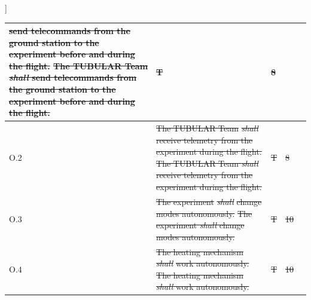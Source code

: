 ]\documentclass[a4paper,12pt,twoside]{article}
\providecommand{\DIFaddtex}[1]{{\protect\color{blue}\uwave{#1}}} %
\providecommand{\DIFdeltex}[1]{{\protect\color{red}\sout{#1}}}                      %
\providecommand{\DIFaddbegin}{} %
\providecommand{\DIFaddend}{} %
\providecommand{\DIFdelbegin}{} %
\providecommand{\DIFdelend}{} %
\providecommand{\DIFadd}[1]{\texorpdfstring{\DIFaddtex{#1}}{#1}} %
\providecommand{\DIFdel}[1]{\texorpdfstring{\DIFdeltex{#1}}{}} %
\newcommand{\DIFscaledelfig}{0.5}
\newlength{\DIFdelgraphicswidth} %
\newlength{\DIFdelgraphicsheight} %
\newcommand{\DIFaddincludegraphics}[2][]{{\color{blue}\fbox{\DIFOincludegraphics[#1]{#2}}}} %
\newcommand{\DIFdelincludegraphics}[2][]{%
\sbox{\DIFdelgraphicsbox}{\DIFOincludegraphics[#1]{#2}}%
\settoboxwidth{\DIFdelgraphicswidth}{\DIFdelgraphicsbox} %
\settoboxtotalheight{\DIFdelgraphicsheight}{\DIFdelgraphicsbox} %
\scalebox{\DIFscaledelfig}{%
\parbox[b]{\DIFdelgraphicswidth}{\usebox{\DIFdelgraphicsbox}\\[-\baselineskip] \rule{\DIFdelgraphicswidth}{0em}}\llap{\resizebox{\DIFdelgraphicswidth}{\DIFdelgraphicsheight}{%
\setlength{\unitlength}{\DIFdelgraphicswidth}%
\begin{picture}(1,1)%
\thicklines\linethickness{2pt} %
{\color[rgb]{1,0,0}\put(0,0){\framebox(1,1){}}}%
{\color[rgb]{1,0,0}\put(0,0){\line( 1,1){1}}}%
{\color[rgb]{1,0,0}\put(0,1){\line(1,-1){1}}}%
\end{picture}%
}\hspace*{3pt}}} %
} %
\DeclareRobustCommand{\DIFaddbegin}{\DIFOaddbegin \let\includegraphics\DIFaddincludegraphics} %
\DeclareRobustCommand{\DIFaddend}{\DIFOaddend \let\includegraphics\DIFOincludegraphics} %
\DeclareRobustCommand{\DIFdelbegin}{\DIFOdelbegin \let\includegraphics\DIFdelincludegraphics} %
\DeclareRobustCommand{\DIFdelend}{\DIFOaddend \let\includegraphics\DIFOincludegraphics} %
\begin{document}
\begin{longtable}[]{|m{}| m{} |m{} |m{}|m{}|}
\DIFdel{send telecommands from the ground station to the experiment before and during the flight.                                             }\DIFdelend \DIFaddbegin \st{The TUBULAR Team \textit{shall} send telecommands from the ground station to the experiment before and during the flight.}\DIFadd{\textsuperscript{\ref{fn:unnecessary-requirement}}                                             }\DIFaddend &    \DIFdelbegin \DIFdel{T          }\DIFdelend \DIFaddbegin \DIFadd{-  }\DIFaddend & \DIFdelbegin \DIFdel{8            }\DIFdelend \DIFaddbegin \DIFadd{-            }\DIFaddend &        \\ \hline
O.2  & \DIFdelbegin \DIFdel{The TUBULAR Team }\textit{\DIFdel{shall}} %
\DIFdel{receive telemetry from the experiment during the flight.                                                                              }\DIFdelend \DIFaddbegin \st{The TUBULAR Team \textit{shall} receive telemetry from the experiment during the flight.}\DIFadd{\textsuperscript{\ref{fn:unnecessary-requirement}}                                                                              }\DIFaddend &   \DIFdelbegin \DIFdel{T          }\DIFdelend \DIFaddbegin \DIFadd{-      }\DIFaddend & \DIFdelbegin \DIFdel{8            }\DIFdelend \DIFaddbegin \DIFadd{-            }\DIFaddend &        \\ \hline
O.3  & \DIFdelbegin \DIFdel{The experiment }\textit{\DIFdel{shall}} %
\DIFdel{change modes autonomously.                                                                                                              }\DIFdelend \DIFaddbegin \st{The experiment \textit{shall} change modes autonomously.}\DIFadd{\textsuperscript{\ref{fn:unnecessary-requirement}}                                                                                                              }\DIFaddend &        \DIFdelbegin \DIFdel{T      }\DIFdelend \DIFaddbegin \DIFadd{-      }\DIFaddend & \DIFdelbegin \DIFdel{10            }\DIFdelend \DIFaddbegin \DIFadd{-          }\DIFaddend &        \\ \hline
O.4  & \DIFdelbegin \DIFdel{The heating mechanism }\textit{\DIFdel{shall}} %
\DIFdel{work autonomously.                                                                                                               }\DIFdelend \DIFaddbegin \st{The heating mechanism \textit{shall} work autonomously.}\DIFadd{\textsuperscript{\ref{fn:unnecessary-requirement}}                                                                                                               }\DIFaddend &        \DIFdelbegin \DIFdel{T      }\DIFdelend \DIFaddbegin \DIFadd{-      }\DIFaddend & \DIFdelbegin \DIFdel{10            }\DIFdelend \DIFaddbegin \DIFadd{-            }\DIFaddend &        \\ \hline

\end{longtable}
\end{document}
